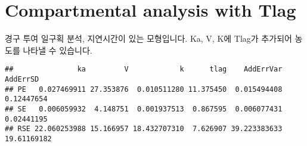 \documentclass[
  9pt,
]{krantz}
\newenvironment{Shaded}{\begin{snugshade}}{\end{snugshade}}
\newcommand{\CommentTok}[1]{\textcolor[rgb]{0.56,0.35,0.01}{\textit{#1}}}
\newcommand{\ControlFlowTok}[1]{\textcolor[rgb]{0.13,0.29,0.53}{\textbf{#1}}}
\newcommand{\DataTypeTok}[1]{\textcolor[rgb]{0.13,0.29,0.53}{#1}}
\newcommand{\DecValTok}[1]{\textcolor[rgb]{0.00,0.00,0.81}{#1}}
\newcommand{\FloatTok}[1]{\textcolor[rgb]{0.00,0.00,0.81}{#1}}
\newcommand{\KeywordTok}[1]{\textcolor[rgb]{0.13,0.29,0.53}{\textbf{#1}}}
\newcommand{\NormalTok}[1]{#1}
\newcommand{\OperatorTok}[1]{\textcolor[rgb]{0.81,0.36,0.00}{\textbf{#1}}}
\newcommand{\StringTok}[1]{\textcolor[rgb]{0.31,0.60,0.02}{#1}}
\begin{document}
\hypertarget{compartmental-analysis-with-tlag}{%
\section{Compartmental analysis with Tlag}\label{compartmental-analysis-with-tlag}}

경구 투여 일구획 분석, 지연시간이 있는 모형입니다. Ka, V, K에 Tlag가 추가되어 농도를 나타낼 수 있습니다.

\begin{Shaded}
\end{Shaded}

\begin{verbatim}
##               ka         V            k      tlag    AddErrVar    AddErrSD
## PE   0.027469911 27.353876  0.010511280 11.375450  0.015494408  0.12447654
## SE   0.006059932  4.148751  0.001937513  0.867595  0.006077431  0.02441195
## RSE 22.060253988 15.166957 18.432707310  7.626907 39.223383633 19.61169182
\end{verbatim}
\end{document}
